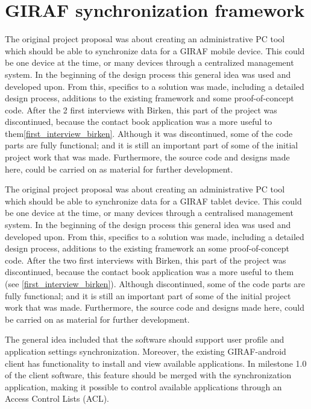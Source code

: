 \section{GIRAF synchronization framework}

The original project proposal was about creating an administrative PC tool which should be able to synchronize data for a GIRAF mobile device. This could be one device at the time, or many devices through a centralized management system. In the beginning of the design process this general idea was used and developed upon. From this, specifics to a solution was made, including a detailed design process, additions to the existing framework and some proof-of-concept code. After the 2 first interviews with Birken, this part of the project was discontinued, because the contact book application was a more useful to them\vref{first_interview_birken}. Although it was discontinued, some of the code parts are fully functional; and it is still an important part of some of the initial project work that was made. Furthermore, the source code and designs made here, could be carried on as material for further development. 

The original project proposal was about creating an administrative PC tool which should be able to synchronize data for a GIRAF tablet device. This could be one device at the time, or many devices through a centralised management system. In the beginning of the design process this general idea was used and developed upon. From this, specifics to a solution was made, including a detailed design process, additions to the existing framework an some proof-of-concept code. After the two first interviews with Birken, this part of the project was discontinued, because the contact book application was a more useful to them (see \vref{first_interview_birken}). Although discontinued, some of the code parts are fully functional; and it is still an important part of some of the initial project work that was made. Furthermore, the source code and designs made here, could be carried on as material for further development. 

The general idea included that the software should support user profile and application settings synchronization. Moreover, the existing GIRAF-android client has functionality to install and view available applications. In milestone 1.0 of the client software, this feature should be merged with the synchronization application, making it possible to control available applications through an Access Control Lists (ACL).


